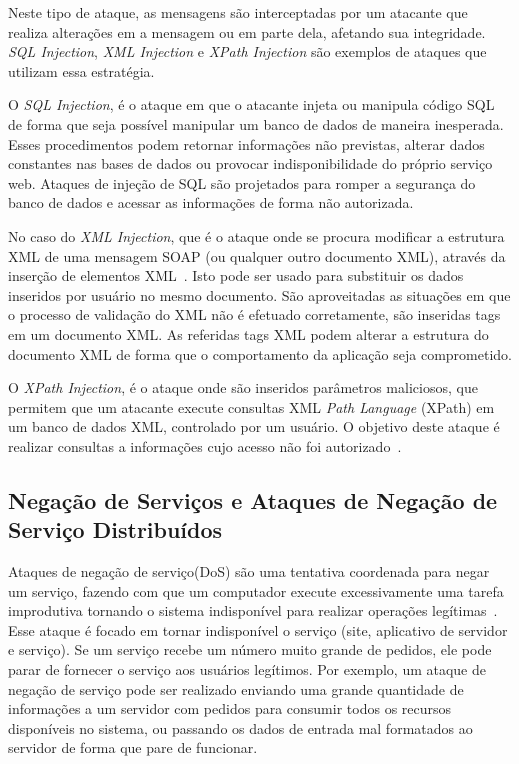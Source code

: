Neste tipo de ataque, as mensagens são interceptadas por um atacante que realiza alterações em a mensagem ou em parte dela, afetando sua integridade. \emph{SQL Injection}, \emph{XML Injection} e \emph{XPath Injection} são exemplos de ataques que utilizam essa estratégia.

O \emph{SQL Injection}, é o ataque em que o atacante injeta ou manipula código SQL de forma que seja possível manipular um banco de dados de maneira inesperada\cite{harwood2010security}. Esses procedimentos podem retornar informações não previstas, alterar dados constantes nas bases de dados ou provocar indisponibilidade do próprio serviço web.  Ataques de injeção de SQL são projetados para romper a segurança do banco de dados e acessar as informações de forma não autorizada.

No caso do \emph{XML Injection}, que é o ataque onde se procura modificar a estrutura XML de uma mensagem SOAP (ou qualquer outro documento XML), através da inserção de elementos XML~\cite{JensenGHL2007}. Isto pode ser usado para substituir os dados inseridos por usuário no mesmo documento. São aproveitadas as situações em que o processo de validação do XML não é efetuado corretamente, são inseridas tags em um documento XML. As referidas tags XML podem alterar a estrutura do documento XML de forma que o comportamento da aplicação seja comprometido.

O \emph{XPath Injection}, é o ataque onde são inseridos parâmetros maliciosos, que permitem que um atacante execute consultas XML \emph{Path Language} (XPath) em um banco de dados XML, controlado por um usuário. O objetivo deste ataque é realizar consultas a informações cujo acesso não foi autorizado~\cite{harwood2010security}.

\subsection{Negação de Serviços e Ataques de Negação de Serviço Distribuídos}

Ataques de negação de serviço(DoS) são uma tentativa coordenada para negar um serviço, fazendo com que um computador execute excessivamente uma tarefa improdutiva tornando o sistema indisponível para realizar operações legítimas~\cite{kim2010fundamentals}. Esse ataque é focado em tornar indisponível o serviço (site, aplicativo de servidor e serviço). Se um serviço recebe um número muito grande de pedidos, ele pode parar de fornecer o serviço aos usuários legítimos. Por exemplo, um ataque de negação de serviço pode ser realizado enviando uma grande quantidade de informações a um servidor com pedidos para consumir todos os recursos disponíveis no sistema, ou passando os dados de entrada mal formatados ao servidor de forma que pare de funcionar.

